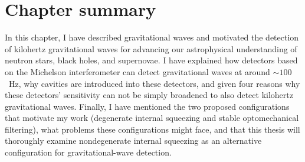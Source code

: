 

\section{Chapter summary}


In this chapter, I have described gravitational waves and motivated the detection of kilohertz gravitational waves for advancing our astrophysical understanding of neutron stars, black holes, and supernovae. I have explained how detectors based on the Michelson interferometer can detect gravitational waves at around $\sim100$~Hz, why cavities are introduced into these detectors, and given four reasons why these detectors' sensitivity can not be simply broadened to also detect kilohertz gravitational waves. Finally, I have mentioned the two proposed configurations that motivate my work (degenerate internal squeezing and stable optomechanical filtering), what problems these configurations might face, and that this thesis will thoroughly examine nondegenerate internal squeezing as an alternative configuration for gravitational-wave detection.


